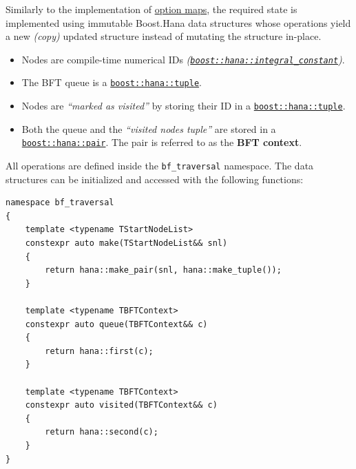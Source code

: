 \documentclass[twoside, 12pt, a4paper, openany]{book}
\begin{document}
Similarly to the implementation of
\protect\hyperlink{metaprogramming_option_maps}{option maps}, the
required state is implemented using immutable Boost.Hana data structures
whose operations yield a new \emph{(copy)} updated structure instead of
mutating the structure in-place.

\begin{itemize}
\item
  Nodes are compile-time numerical IDs
  \emph{(\href{http://www.boost.org/doc/libs/1_61_0/libs/hana/doc/html/structboost_1_1hana_1_1integral__constant.html}{\texttt{boost::hana::integral_constant}})}.
\item
  The BFT queue is a
  \href{http://www.boost.org/doc/libs/1_61_0/libs/hana/doc/html/structboost_1_1hana_1_1tuple.html}{\texttt{boost::hana::tuple}}.
\item
  Nodes are \emph{``marked as visited''} by storing their ID in a
  \href{http://www.boost.org/doc/libs/1_61_0/libs/hana/doc/html/structboost_1_1hana_1_1tuple.html}{\texttt{boost::hana::tuple}}.
\item
  Both the queue and the \emph{``visited nodes tuple''} are stored in a
  \href{http://www.boost.org/doc/libs/1_61_0/libs/hana/doc/html/structboost_1_1hana_1_1pair.html}{\texttt{boost::hana::pair}}.
  The pair is referred to as the \textbf{BFT context}.
\end{itemize}

All operations are defined inside the
\texttt{bf_traversal}
namespace. The data structures can be initialized and accessed with the
following functions:

\begin{verbatim}
namespace bf_traversal
{
    template <typename TStartNodeList>
    constexpr auto make(TStartNodeList&& snl)
    {
        return hana::make_pair(snl, hana::make_tuple());
    }

    template <typename TBFTContext>
    constexpr auto queue(TBFTContext&& c)
    {
        return hana::first(c);
    }

    template <typename TBFTContext>
    constexpr auto visited(TBFTContext&& c)
    {
        return hana::second(c);
    }
}
\end{verbatim}
\end{document}
